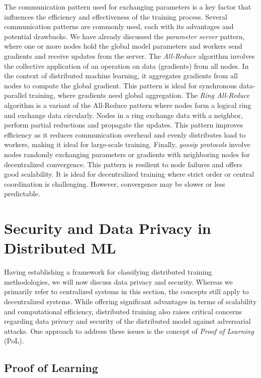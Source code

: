 \documentclass[11pt]{article}
\begin{document}
The communication pattern used for exchanging parameters is a key factor that influences the efficiency and effectiveness of the training process. Several communication patterns are commonly used, each with its advantages and potential drawbacks. We have already discussed the \textit{parameter server} pattern, where one or more nodes hold the global model parameters and workers send gradients and receive updates from the server. The \textit{All-Reduce} algorithm involves the collective application of an operation on data (gradients) from all nodes. In the context of distributed machine learning, it aggregates gradients from all nodes to compute the global gradient. This pattern is ideal for synchronous data-parallel training, where gradients need global aggregation. The \textit{Ring All-Reduce} algorithm is a variant of the All-Reduce pattern where nodes form a logical ring and exchange data circularly. Nodes in a ring exchange data with a neighbor, perform partial reductions and propagate the updates. This pattern improves efficiency as it reduces communication overhead and evenly distributes load to workers, making it ideal for large-scale training. Finally, \textit{gossip protocols} involve nodes randomly exchanging parameters or gradients with neighboring nodes for decentralized convergence. This pattern is resilient to node failures and offers good scalability. It is ideal for decentralized training where strict order or central coordination is challenging. However, convergence may be slower or less predictable.

\section*{Security and Data Privacy in Distributed ML}

Having establishing a framework for classifying distributed training methodologies, we will now discuss data privacy and security. Whereas we primarily refer to centralized systems in this section, the concepts still apply to decentralized systems. While offering significant advantages in terms of scalability and computational efficiency, distributed training also raises critical concerns regarding data privacy and security of the distributed model against adversarial attacks. One approach to address these issues is the concept of \textit{Proof of Learning} (PoL).

\subsection*{Proof of Learning}
\end{document}
